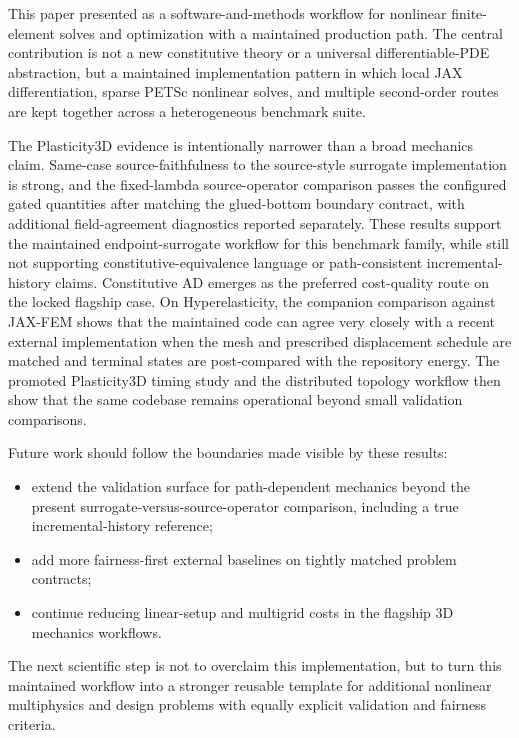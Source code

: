 This paper presented \repo{} as a software-and-methods workflow for nonlinear
finite-element solves and optimization with a maintained \jaxpetsc{} production
path. The central contribution is not a new constitutive theory or a universal
differentiable-PDE abstraction, but a maintained implementation pattern in
which local JAX differentiation, sparse PETSc nonlinear solves, and multiple
second-order routes are kept together across a heterogeneous benchmark suite.

The Plasticity3D evidence is intentionally narrower than a broad mechanics
claim. Same-case source-faithfulness to the source-style surrogate
implementation is strong, and the fixed-lambda source-operator comparison
passes the configured gated quantities after matching the glued-bottom
boundary contract, with additional field-agreement diagnostics reported
separately. These results support the maintained
endpoint-surrogate workflow for this benchmark family, while still not
supporting constitutive-equivalence language or path-consistent
incremental-history claims. Constitutive AD emerges as the preferred
cost-quality route on the locked flagship case. On Hyperelasticity, the
companion comparison
against JAX-FEM shows that the maintained code can agree very closely with a
recent external implementation when the mesh and prescribed displacement
schedule are matched and terminal states are post-compared with the repository
energy. The promoted Plasticity3D timing study and the distributed topology
workflow then show that the same codebase remains operational beyond small
validation comparisons.

Future work should follow the boundaries made visible by these results:
\begin{itemize}
  \item extend the validation surface for path-dependent mechanics beyond the
        present surrogate-versus-source-operator comparison, including a true
        incremental-history reference;
  \item add more fairness-first external baselines on tightly matched problem
        contracts;
  \item continue reducing linear-setup and multigrid costs in the flagship 3D
        mechanics workflows.
\end{itemize}

The next scientific step is not to overclaim this implementation, but
to turn this maintained workflow into a stronger reusable template for
additional nonlinear multiphysics and design problems with equally explicit
validation and fairness criteria.
